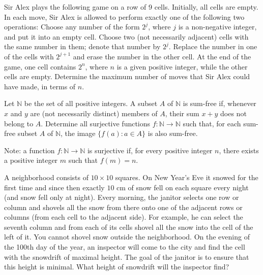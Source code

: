\documentclass[11pt]{scrartcl}
\begin{document}
\begin{problem}[7146141883280672441]
	Sir Alex plays the following game on a row of 9 cells. Initially, all cells are empty. In each move, Sir Alex is allowed to perform exactly one of the following two operations:
Choose any number of the form $2^j$, where $j$ is a non-negative integer, and put it into an empty cell.
Choose two (not necessarily adjacent) cells with the same number in them; denote that number by $2^j$. Replace the number in one of the cells with $2^{j+1}$ and erase the number in the other cell.
At the end of the game, one cell contains $2^n$, where $n$ is a given positive integer, while the other cells are empty. Determine the maximum number of moves that Sir Alex could have made, in terms of $n$.
\end{problem}
\begin{problem}[512148051997527]
	Let $\mathbb N$ be the set of all positive integers. A subset $A$ of $\mathbb N$ is sum-free if, whenever $x$ and $y$ are (not necessarily distinct) members of $A$, their sum $x+y$ does not belong to $A$. Determine all surjective functions $f:\mathbb N\to\mathbb N$ such that, for each sum-free subset $A$ of $\mathbb N$, the image $\{f(a):a\in A\}$ is also sum-free.

Note: a function $f:\mathbb N\to\mathbb N$ is surjective if, for every positive integer $n$, there exists a positive integer $m$ such that $f(m)=n$.
\end{problem}
\begin{problem}[2201137214247796233]
A neighborhood consists of $10 \times 10$ squares. On New Year's Eve it snowed for the first time and since then exactly $10$ cm of snow fell on each square every night (and snow fell only at night). Every morning, the janitor selects one row or column and shovels all the snow from there onto one of the adjacent rows or columns (from each cell to the adjacent side). For example, he can select the seventh column and from each of its cells shovel all the snow into the cell of the left of it. You cannot shovel snow outside the neighborhood. On the evening of the 100th day of the year, an inspector will come to the city and find the cell with the snowdrift of maximal height. The goal of the janitor is to ensure that this height is minimal. What height of snowdrift will the inspector find?
\end{problem}
\end{document}
